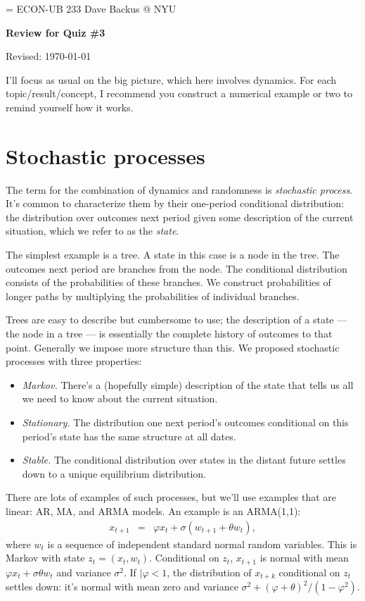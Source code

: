 \documentclass[11pt]{article}
\begin{document}
\parskip=\bigskipamount
\parindent=0.0in
\thispagestyle{empty}
{\large ECON-UB 233 \hfill Dave Backus @ NYU}

\bigskip\bigskip
\centerline{\Large \bf Review for Quiz \#3}
\centerline{Revised: \today}

\bigskip
I'll focus as usual on the big picture, which here involves dynamics.
For each topic/result/concept, I recommend you construct a numerical example or two to
remind yourself how it works.


\section{Stochastic processes}

The term for the combination of dynamics and randomness is {\it stochastic process\/}.
It's common to characterize them by their one-period conditional distribution:
the distribution over outcomes next period given
some description of the current situation, which we refer to as the {\it state\/}.

The simplest example is a tree.
A state in this case is a node in the tree.
The outcomes next period are branches from the node.
The conditional distribution consists of the probabilities of these branches.
We construct probabilities of longer paths by multiplying the probabilities of individual branches.

Trees are easy to describe but cumbersome to use;
the description of a state --- the node in a tree --- is essentially the complete
history of outcomes to that point.
Generally we impose more structure than this.
We proposed stochastic processes with three properties:
\begin{itemize}
\item {\it Markov.\/} There's a (hopefully simple) description of the state
that tells us all we need to know about the current situation.
\item {\it Stationary.\/}
The distribution one next period's outcomes conditional on this period's state
has the same structure at all dates.
\item {\it Stable.\/}
The conditional distribution over states in the distant future settles down
to a unique equilibrium distribution.
\end{itemize}

There are lots of examples of such processes, but we'll use
examples that are linear:  AR, MA, and ARMA models.
An example is an ARMA(1,1):
\begin{eqnarray*}
    x_{t+1} &=& \varphi x_{t} + \sigma ( w_{t+1} + \theta w_t ) ,
\end{eqnarray*}
where $ w_t$ is a sequence of independent standard normal random variables.
This is Markov with state $z_t = (x_t,w_t)$.
Conditional on $z_t$, $x_{t+1}$ is normal with mean $\varphi x_t + \sigma\theta w_t$
and variance $\sigma^2$.
If $| \varphi < 1$,
the distribution of $x_{t+k}$ conditional on $z_t$ settles down:
it's normal with mean zero and variance $ \sigma^2 + (\varphi+\theta)^2/(1-\varphi^2) $.
\end{document}
